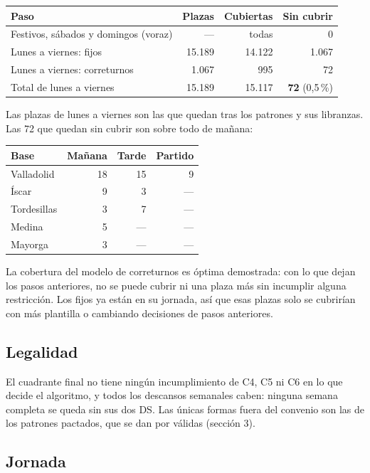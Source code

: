 \documentclass[11pt,a4paper]{article}
\begin{document}
\begin{center}
\begin{tabular}{@{}lrrr@{}}
  \toprule
  Paso & Plazas & Cubiertas & Sin cubrir \\
  \midrule
  Festivos, sábados y domingos (voraz) & --- & todas & 0 \\
  Lunes a viernes: fijos & 15.189 & 14.122 & 1.067 \\
  Lunes a viernes: correturnos & 1.067 & 995 & 72 \\
  \midrule
  Total de lunes a viernes & 15.189 & 15.117 & \textbf{72} (0,5\,\%) \\
  \bottomrule
\end{tabular}
\end{center}
Las plazas de lunes a viernes son las que quedan tras los patrones y sus libranzas. Las 72 que
quedan sin cubrir son sobre todo de mañana:
\begin{center}
\begin{tabular}{@{}lrrr@{}}
  \toprule
  Base & Mañana & Tarde & Partido \\
  \midrule
  Valladolid & 18 & 15 & 9 \\
  Íscar & 9 & 3 & --- \\
  Tordesillas & 3 & 7 & --- \\
  Medina & 5 & --- & --- \\
  Mayorga & 3 & --- & --- \\
  \bottomrule
\end{tabular}
\end{center}
La cobertura del modelo de correturnos es óptima demostrada: con lo que dejan los pasos
anteriores, no se puede cubrir ni una plaza más sin incumplir alguna restricción. Los fijos ya
están en su jornada, así que esas plazas solo se cubrirían con más plantilla o cambiando
decisiones de pasos anteriores.

\subsection{Legalidad}

El cuadrante final no tiene ningún incumplimiento de C4, C5 ni C6 en lo que decide el
algoritmo, y todos los descansos semanales caben: ninguna semana completa se queda sin sus dos
DS. Las únicas formas fuera del convenio son las de los patrones pactados, que se dan por
válidas (sección 3).

\subsection{Jornada}
\end{document}
